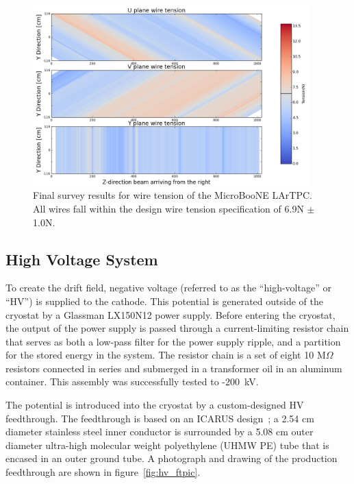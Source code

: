 \begin{figure}
\centering
\includegraphics[width=0.95\textwidth]{figures/WireTension_201605_updatedcolors.png}
\caption{Final survey results for wire tension of the MicroBooNE LArTPC. All wires fall within the design wire tension specification of 6.9N $\pm$ 1.0N.}
\label{fig:heatmap}
\end{figure} 





%
\subsection{High Voltage System}
\label{sec:hv}

To create the drift field, negative voltage (referred to as the ``high-voltage'' or ``HV'') is supplied to the \lartpc cathode.  This potential is generated outside of the cryostat by a Glassman LX150N12 power supply.  Before entering the cryostat, the output of the power supply is passed through a current-limiting resistor chain that serves as both a low-pass filter for the power supply ripple, and a partition for the stored energy in the system.  The resistor chain is a set of eight 10 M$\Omega$ resistors connected in series and submerged in a transformer oil in an aluminum container.  This assembly was successfully tested to -200~kV. 

The potential is introduced into the cryostat by a custom-designed HV feedthrough.  The feedthrough is based on an ICARUS design~\cite{Amerio:2004-T600}; a 2.54 cm diameter stainless steel inner conductor is surrounded by a 5.08 cm outer diameter ultra-high molecular weight polyethylene (UHMW PE) tube that is encased in an outer ground tube.  A photograph and drawing of the production feedthrough are shown in figure~\ref{fig:hv_ftpic}.

